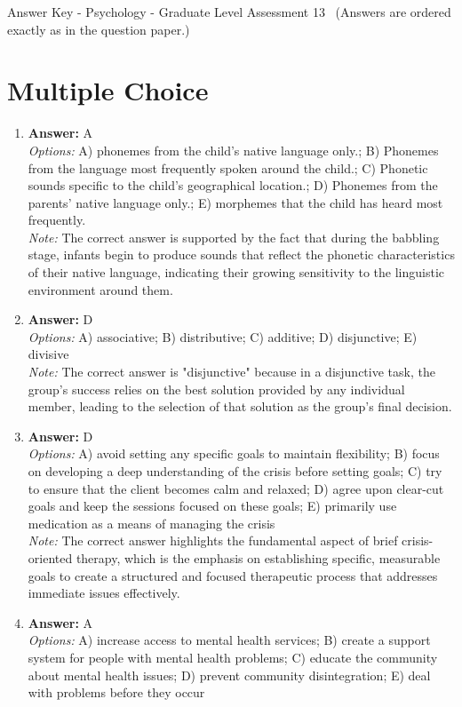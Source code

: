 \documentclass[12pt]{article}
\begin{document}
\begin{center}
Answer Key - Psychology - Graduate Level Assessment 13 \
\small (Answers are ordered exactly as in the question paper.)
\end{center}

\section*{Multiple Choice}
\begin{enumerate}[label=\arabic*.]
\item \textbf{Answer:} A
\\ \textit{Options:} A) phonemes from the child's native language only.; B) Phonemes from the language most frequently spoken around the child.; C) Phonetic sounds specific to the child's geographical location.; D) Phonemes from the parents' native language only.; E) morphemes that the child has heard most frequently.
\\ \textit{Note:} The correct answer is supported by the fact that during the babbling stage, infants begin to produce sounds that reflect the phonetic characteristics of their native language, indicating their growing sensitivity to the linguistic environment around them.
\item \textbf{Answer:} D
\\ \textit{Options:} A) associative; B) distributive; C) additive; D) disjunctive; E) divisive
\\ \textit{Note:} The correct answer is "disjunctive" because in a disjunctive task, the group's success relies on the best solution provided by any individual member, leading to the selection of that solution as the group's final decision.
\item \textbf{Answer:} D
\\ \textit{Options:} A) avoid setting any specific goals to maintain flexibility; B) focus on developing a deep understanding of the crisis before setting goals; C) try to ensure that the client becomes calm and relaxed; D) agree upon clear-cut goals and keep the sessions focused on these goals; E) primarily use medication as a means of managing the crisis
\\ \textit{Note:} The correct answer highlights the fundamental aspect of brief crisis-oriented therapy, which is the emphasis on establishing specific, measurable goals to create a structured and focused therapeutic process that addresses immediate issues effectively.
\item \textbf{Answer:} A
\\ \textit{Options:} A) increase access to mental health services; B) create a support system for people with mental health problems; C) educate the community about mental health issues; D) prevent community disintegration; E) deal with problems before they occur

\end{enumerate}
\end{document}
